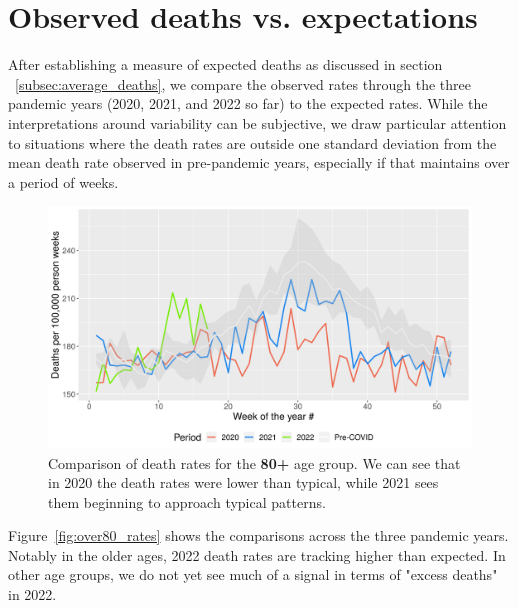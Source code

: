 \documentclass[
10pt, %
a4paper, %
oneside, %
DIV=16,
parskip=full,
headinclude,footinclude %
]{scrartcl}
\begin{document}

\section{Observed deaths vs. expectations}

After establishing a measure of expected deaths as discussed in section ~\vref{subsec:average_deaths}, we compare the observed rates through the three pandemic years (2020, 2021, and 2022 so far) to the expected rates. While the interpretations around variability can be subjective, we draw particular attention to situations where the death rates are outside one standard deviation from the mean death rate observed in pre-pandemic years, especially if that maintains over a period of weeks.

\begin{figure}[tb]
\centering 
\includegraphics[width=1.0\columnwidth]{plots/deaths_over_80} 
\caption[Death rates in the over 80 age group]{Comparison of death rates for the \textbf{80+} age group. We can see that in 2020 the death rates were lower than typical, while 2021 sees them beginning to approach typical patterns.}
\label{fig:over80_rates} 
\end{figure}

Figure~\vref{fig:over80_rates} shows the comparisons across the three pandemic years. Notably in the older ages, 2022 death rates are tracking higher than expected. In other age groups, we do not yet see much of a signal in terms of "excess deaths" in 2022. 
\end{document}
